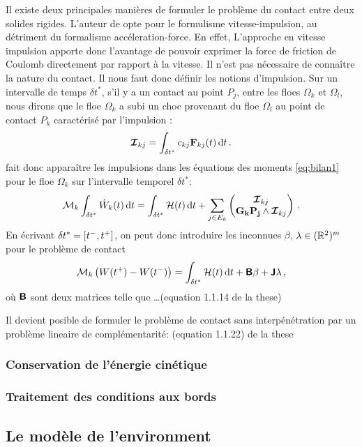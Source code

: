 Il existe deux principales manières de formuler le problème du contact entre deux solides rigides. L'auteur de \parencite{rabatel2015thesis} opte pour le formulisme vitesse-impulsion, au détriment du formalisme accéleration-force. En effet, L’approche en vitesse impulsion apporte donc l’avantage de pouvoir exprimer la force de friction de Coulomb directement par rapport à la vitesse. Il n’est pas nécessaire de connaître la nature du contact. 
Il nous faut donc définir les notions d'impulsion. Sur un intervalle de temps $\delta t^*$, s’il y a un contact au point $P_j$, entre les floes $\Omega_k$ et $\Omega_l$, nous dirons que le floe $\Omega_k$ a subi un choc provenant du floe $\Omega_l$ au point de contact $P_k$ caractérisé par l’impulsion :
$$
\bvec{\mathcal{I}}_{kj} = \int_{\delta t^*} c_{kj} \bvec{F}_{kj}(t) \diff t \,.
$$ 
\citeauthor{rabatel2015thesis} fait donc apparaître les impulsions dans les équations des moments \cref*{eq:bilan1} pour le floe $\Omega_k$ sur l’intervalle temporel $\delta t^*$:
$$
\mathcal{M}_k \int_{\dtstar} \dot{W}_k(t) \diff t = \int_{\dtstar} \mathcal{H}(t) \diff t + \sum_{j \in E_k} \begin{pmatrix}
    \bvec{\mathcal{I}}_{kj} \\ \bvec{G_kP_j} \wedge \bvec{\mathcal{I}}_{kj} 
\end{pmatrix} \,.
$$
En écrivant $\delta t^* = [t^{-}, t^{+}]$, on peut donc introduire les inconnues $\beta$, $\lambda \in (\mathbb{R}^2)^m$ pour le problème de contact  
\begin{align}
    \mathcal{M}_k \left( W(t^{+}) - W(t^{-}) \right) = \int_{\dtstar} \mathcal{H}(t) \diff t + \bmat{B}\beta + \bmat{J}\lambda \,,
\end{align}
où $\bm{\mathsf{B}}$ sont deux matrices telle que \dots (equation 1.1.14 de la these)

Il devient posible de formuler le problème de contact sans interpénétration par un problème lineaire de complémentarité:
(equation 1.1.22) de la these

\subsubsection{Conservation de l'énergie cinétique}

\subsubsection{Traitement des conditions aux bords}

\subsection{Le modèle de l'environment}



